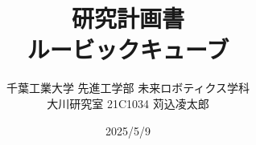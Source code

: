\documentclass[uplatex,twocolumn]{jsarticle}
\begin{document}
 
\title{\large 研究計画書\\
\huge ルービックキューブ}
\author{千葉工業大学 先進工学部 未来ロボティクス学科\\
大川研究室 21C1034 苅込凌太郎}
\date{2025/5/9} 
\maketitle








\end{document}
